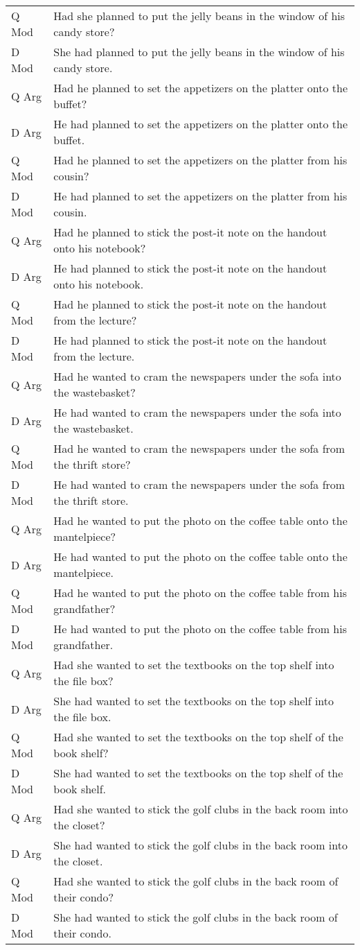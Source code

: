 \documentclass[11pt,oneside]{book}
\begin{document}
\begin{longtable}{ll}
Q Mod & Had she planned to put the jelly beans in the window of his candy store?\\
D Mod & She had planned to put the jelly beans in the window of his candy store.\\
\addlinespace
Q Arg & Had he planned to set the appetizers on the platter onto the buffet?\\
D Arg & He had planned to set the appetizers on the platter onto the buffet.\\
Q Mod & Had he planned to set the appetizers on the platter from his cousin?\\
D Mod & He had planned to set the appetizers on the platter from his cousin.\\
\addlinespace
Q Arg & Had he planned to stick the post-it note on the handout onto his notebook?\\
D Arg & He had planned to stick the post-it note on the handout onto his notebook.\\
Q Mod & Had he planned to stick the post-it note on the handout from the lecture?\\
D Mod & He had planned to stick the post-it note on the handout from the lecture.\\
\addlinespace
Q Arg & Had he wanted to cram the newspapers under the sofa into the wastebasket?\\
D Arg & He had wanted to cram the newspapers under the sofa into the wastebasket.\\
Q Mod & Had he wanted to cram the newspapers under the sofa from the thrift store?\\
D Mod & He had wanted to cram the newspapers under the sofa from the thrift store.\\
\addlinespace
Q Arg & Had he wanted to put the photo on the coffee table onto the mantelpiece?\\
D Arg & He had wanted to put the photo on the coffee table onto the mantelpiece.\\
Q Mod & Had he wanted to put the photo on the coffee table from his grandfather?\\
D Mod & He had wanted to put the photo on the coffee table from his grandfather.\\
\addlinespace
Q Arg & Had she wanted to set the textbooks on the top shelf into the file box?\\
D Arg & She had wanted to set the textbooks on the top shelf into the file box.\\
Q Mod & Had she wanted to set the textbooks on the top shelf of the book shelf?\\
D Mod & She had wanted to set the textbooks on the top shelf of the book shelf.\\
\addlinespace
Q Arg & Had she wanted to stick the golf clubs in the back room into the closet?\\
D Arg & She had wanted to stick the golf clubs in the back room into the closet.\\
Q Mod & Had she wanted to stick the golf clubs in the back room of their condo?\\
D Mod & She had wanted to stick the golf clubs in the back room of their condo.\\*
\end{longtable}
\end{document}
